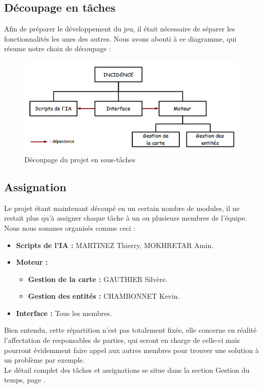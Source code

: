 \documentclass[a4paper]{article}
\newcommand{\alinea}{\hspace*{0.5cm}}
\begin{document}
      \subsection{Découpage en tâches}
        \alinea Afin de préparer le développement du jeu, il était nécessaire de séparer les fonctionnalités les unes des autres. Nous avons abouti à ce diagramme, qui résume notre choix de découpage :
        \begin{figure}
          \begin{center}
            \includegraphics[scale=0.5]{DiagrammeDecoupageProjet.png}
          \end{center}
          \label{DiagDecoupage}
          \caption{Découpage du projet en sous-tâches}
        \end{figure}

      \subsection{Assignation}
        \alinea Le projet étant maintenant découpé en un certain nombre de modules, il ne restait plus qu'à assigner chaque tâche à un ou plusieurs membres de l'équipe. Nous nous sommes organisés comme ceci :
        \begin{itemize}
          \item \textbf{Scripts de l'IA :} MARTINEZ Thierry, MOKHRETAR Amin.
          \item \textbf{Moteur :}
          \begin{itemize}
            \item \textbf{Gestion de la carte :} GAUTHIER Silvère.
            \item \textbf{Gestion des entités :} CHAMBONNET Kevin.
          \end{itemize}
          \item \textbf{Interface :} Tous les membres.
        \end{itemize}
        \alinea Bien entendu, cette répartition n'est pas totalement fixée, elle concerne en réalité l'affectation de responsables de parties, qui seront en charge de celle-ci mais pourront évidemment faire appel aux autres membres pour trouver une solution à un problème par exemple.\\
        \alinea Le détail complet des tâches et assignations se situe dans la section Gestion du temps, page \pageref{GestionTps}.
\end{document}
